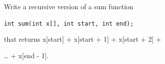 Write a recursive version of a sum function



\verb!int sum(int x[], int start, int end);!



that returns x[start] + x[start + 1] + x[start + 2] +

\ldots{} + x[end - 1].

